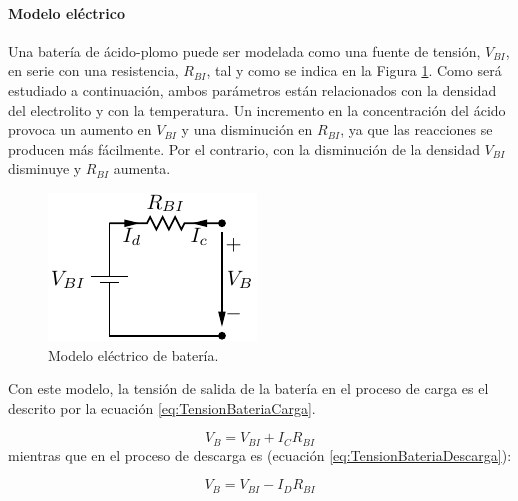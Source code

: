 \paragraph{Modelo eléctrico}

Una batería de ácido-plomo puede ser modelada como una fuente de tensión,
$V_{BI}$, en serie con una resistencia, $R_{BI}$, tal y como se
indica en la Figura \ref{fig:Modelo-de-bateria}.
Como será estudiado a continuación, ambos parámetros están relacionados
con la densidad del electrolito y con la temperatura. Un incremento
en la concentración del ácido provoca un aumento en $V_{BI}$ y una
disminución en $R_{BI}$, ya que las reacciones se producen más fácilmente.
Por el contrario, con la disminución de la densidad $V_{BI}$ disminuye
y $R_{BI}$ aumenta. 

%
\begin{figure}
\includegraphics{../figs/Bateria}

\caption{Modelo eléctrico de batería.\label{fig:Modelo-de-bateria}}

\end{figure}


Con este modelo, la tensión de salida de la batería en el proceso
de carga es el descrito por la ecuación \ref{eq:TensionBateriaCarga}. 

\begin{equation}
V_{B}=V_{BI}+I_{C}R_{BI}\label{eq:TensionBateriaCarga}\end{equation}
mientras que en el proceso de descarga es (ecuación \ref{eq:TensionBateriaDescarga}):

\begin{equation}
V_{B}=V_{BI}-I_{D}R_{BI}\label{eq:TensionBateriaDescarga}\end{equation}

